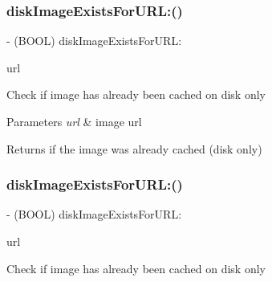 \subsubsection{\texorpdfstring{disk\+Image\+Exists\+For\+U\+R\+L\+:()}{diskImageExistsForURL:()}\hspace{0.1cm}{\footnotesize\ttfamily [2/3]}}
{\footnotesize\ttfamily -\/ (B\+O\+OL) disk\+Image\+Exists\+For\+U\+R\+L\+: \begin{DoxyParamCaption}\item[{(N\+S\+U\+RL $\ast$)}]{url }\end{DoxyParamCaption}}

Check if image has already been cached on disk only


\begin{DoxyParams}{Parameters}
{\em url} & image url\\
\hline
\end{DoxyParams}
\begin{DoxyReturn}{Returns}
if the image was already cached (disk only) 
\end{DoxyReturn}
\mbox{\label{interface_s_d_web_image_manager_a7ed53c304da787466f777c636447e6d0}} 
\subsubsection{\texorpdfstring{disk\+Image\+Exists\+For\+U\+R\+L\+:()}{diskImageExistsForURL:()}\hspace{0.1cm}{\footnotesize\ttfamily [3/3]}}
{\footnotesize\ttfamily -\/ (B\+O\+OL) disk\+Image\+Exists\+For\+U\+R\+L\+: \begin{DoxyParamCaption}\item[{(N\+S\+U\+RL $\ast$)}]{url }\end{DoxyParamCaption}}

Check if image has already been cached on disk only



